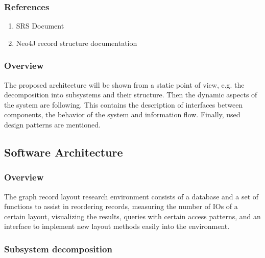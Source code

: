 		\subsubsection{References}
			\begin{enumerate}
				\item SRS Document
				\item Neo4J record structure documentation
			\end{enumerate}
			
		\subsubsection{Overview}
			The proposed architecture will be shown from a static point of view, e.g. the decomposition into subsystems and their structure. Then the dynamic aspects of the system are following. This contains the description of interfaces between components, the behavior of the system and information flow. Finally, used design patterns are mentioned.
			
			
	\subsection{Software Architecture}
		\subsubsection{Overview}
		The graph record layout research environment consists of a database and a set of functions to assist in reordering records, measuring the number of IOs of a certain layout, visualizing the results, queries with certain access patterns, and an interface to implement new layout methods easily into the environment.

			
		\subsubsection{Subsystem decomposition}
